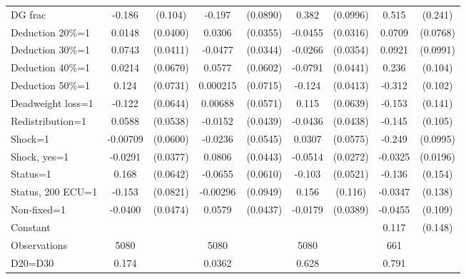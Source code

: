 \begin{tabular}{l|cccccc|cc}
DG frac         &   -0.186\sym{*}  &  (0.104)&   -0.197\sym{**} & (0.0890)&    0.382\sym{***}& (0.0996)&    0.515\sym{**} &  (0.241)\\
Deduction 20\%=1&   0.0148         & (0.0400)&   0.0306         & (0.0355)&  -0.0455         & (0.0316)&   0.0709         & (0.0768)\\
Deduction 30\%=1&   0.0743\sym{*}  & (0.0411)&  -0.0477         & (0.0344)&  -0.0266         & (0.0354)&   0.0921         & (0.0991)\\
Deduction 40\%=1&   0.0214         & (0.0670)&   0.0577         & (0.0602)&  -0.0791\sym{*}  & (0.0441)&    0.236\sym{**} &  (0.104)\\
Deduction 50\%=1&    0.124\sym{*}  & (0.0731)& 0.000215         & (0.0715)&   -0.124\sym{***}& (0.0413)&   -0.312\sym{***}&  (0.102)\\
Deadweight loss=1&   -0.122\sym{*}  & (0.0644)&  0.00688         & (0.0571)&    0.115\sym{*}  & (0.0639)&   -0.153         &  (0.141)\\
Redistribution=1&   0.0588         & (0.0538)&  -0.0152         & (0.0439)&  -0.0436         & (0.0438)&   -0.145         &  (0.105)\\
Shock=1         & -0.00709         & (0.0600)&  -0.0236         & (0.0545)&   0.0307         & (0.0575)&   -0.249\sym{**} & (0.0995)\\
Shock, yes=1    &  -0.0291         & (0.0377)&   0.0806\sym{*}  & (0.0443)&  -0.0514\sym{*}  & (0.0272)&  -0.0325         & (0.0196)\\
Status=1        &    0.168\sym{***}& (0.0642)&  -0.0655         & (0.0610)&   -0.103\sym{**} & (0.0521)&   -0.136         &  (0.154)\\
Status, 200 ECU=1&   -0.153\sym{*}  & (0.0821)& -0.00296         & (0.0949)&    0.156         &  (0.116)&  -0.0347         &  (0.138)\\
Non-fixed=1     &  -0.0400         & (0.0474)&   0.0579         & (0.0437)&  -0.0179         & (0.0389)&  -0.0455         &  (0.109)\\
Constant        &                  &         &                  &         &                  &         &    0.117         &  (0.148)\\
\hline
Observations    &     5080         &         &     5080         &         &     5080         &         &      661         &         \\
D20=D30         &    0.174         &         &   0.0362         &         &    0.628         &         &    0.791         &         \\

\end{tabular}
